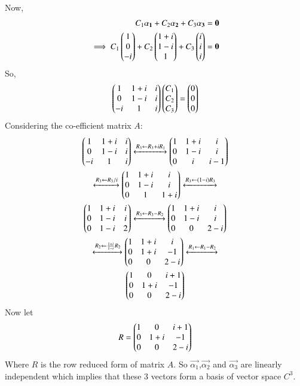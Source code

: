 Now,
\begin{align}
C_1 \mathbf{\alpha_1} +C_2 \mathbf{\alpha_2}+C_3 \mathbf{\alpha_3} = \mathbf{0}\\
\implies C_1 \begin{pmatrix}1\\0\\-i\end{pmatrix}+ C_2\begin{pmatrix}1+i\\1-i\\1\end{pmatrix} + C_3\begin{pmatrix}i\\i\\i\end{pmatrix} = \mathbf{0}
\end{align}
So,
\begin{align}
\begin{pmatrix}1 & 1+i & i\\0 & 1-i & i\\-i & 1 & i\end{pmatrix}\begin{pmatrix}C_1\\C_2\\C_3\end{pmatrix} = \begin{pmatrix}0\\0\\0\end{pmatrix}
\end{align}
Considering the co-efficient matrix $A$:
\begin{multline}
\begin{pmatrix}1 & 1+i & i\\0 & 1-i & i\\-i & 1 & i\end{pmatrix}\xleftrightarrow[]{R_3\leftarrow R_3+iR_1}\begin{pmatrix}1 & 1+i & i\\0 & 1-i & i\\0 & i & i-1\end{pmatrix}\\
\xleftrightarrow[]{R_3\leftarrow R_3/i}\begin{pmatrix}1 & 1+i & i\\0 & 1-i & i\\0 & 1 & 1+i\end{pmatrix}\xleftrightarrow[]{R_3\leftarrow (1-i)R_3}\\
\begin{pmatrix}1 & 1+i & i\\0 & 1-i & i\\0 & 1-i & 2\end{pmatrix}\xleftrightarrow[]{R_3\leftarrow R_3-R_2}\begin{pmatrix}1 & 1+i & i\\0 & 1-i & i\\0 & 0 & 2-i\end{pmatrix}\\
\xleftrightarrow[]{R_2\leftarrow \frac{1+i}{1-i}R_2}\begin{pmatrix}1 & 1+i & i\\0 & 1+i & -1\\0 & 0 & 2-i\end{pmatrix}\xleftrightarrow[]{R_1\leftarrow R_1-R_2}\\
\begin{pmatrix}1 & 0 & i+1\\0 & 1+i & -1\\0 & 0 & 2-i\end{pmatrix}
\end{multline}
Now let 
\begin{align}
R = \begin{pmatrix}1 & 0 & i+1\\0 & 1+i & -1\\0 & 0 & 2-i\end{pmatrix}
\end{align}
Where $R$ is the row reduced form of matrix $A$. So $\vec{\alpha_1}$,$\vec{\alpha_2}$ and $\vec{\alpha_3}$ are linearly independent which implies that these 3 vectors form a basis of vector space $C^3$.

